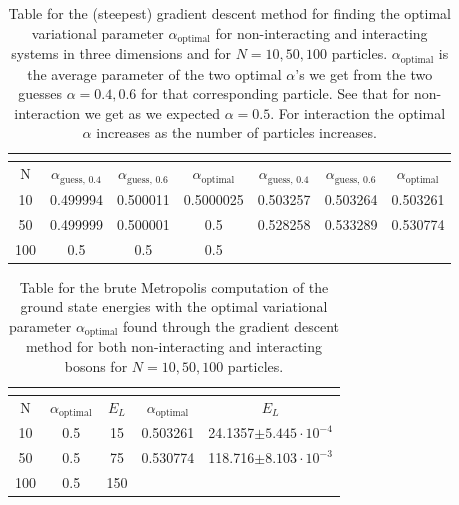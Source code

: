 \documentclass[12pt,a4paper,english]{article}
\begin{document}
\begin{table}[htbp!]
	\centering
	\begin{tabular}{ |c|c|c|c|c|c|c| }
		\hline \rule{0pt}{13pt}
		\text{System} & \multicolumn{3}{c|}{\text{Non-interacting}}  & \multicolumn{3}{c|}{\text{Interacting}}\\
		\hline \rule{0pt}{13pt}
		N & $\alpha_{\text{guess, 0.4}}$ & $\alpha_{\text{guess, 0.6}}$ & $\alpha_{\text{optimal}}$ & $\alpha_{\text{guess, 0.4}}$ & $\alpha_{\text{guess, 0.6}}$ & $\alpha_{\text{optimal}}$  \\
		\hline \rule{0pt}{13pt}
		10 & 0.499994 & 0.500011 & 0.5000025 & 0.503257 & 0.503264 & 0.503261 \\
		\hline \rule{0pt}{13pt}
		50 & 0.499999 & 0.500001 & 0.5 & 0.528258 & 0.533289 & 0.530774 \\
		\hline \rule{0pt}{13pt}
		100 & 0.5 & 0.5 & 0.5 &  &  &  \\
		\hline
	\end{tabular}	
	\caption{Table for the (steepest) gradient descent method for finding the optimal variational parameter $\alpha_{\text{optimal}}$ for non-interacting and interacting systems in three dimensions and for $N=10,50,100$ particles. $\alpha_{\text{optimal}}$ is the average parameter of the two optimal $\alpha$'s we get from the two guesses $\alpha=0.4,0.6$ for that corresponding particle. See that for non-interaction we get as we expected $\alpha=0.5$. For interaction the optimal $\alpha$ increases as the number of particles increases. \label{tab:gradient}}
\end{table}

\begin{table}[htbp!]
	\centering
	\begin{tabular}{ |c|c|c|c|c| }
		\hline \rule{0pt}{13pt}
		\text{System} & \multicolumn{2}{c|}{\text{Non-interacting}}  & \multicolumn{2}{c|}{\text{Interacting}} \\
		\hline \rule{0pt}{13pt}
		N &  $\alpha_{\text{optimal}}$ & $E_L$ & $\alpha_{\text{optimal}}$ & $E_L$ \\
		\hline \rule{0pt}{13pt}
		10 & 0.5 & 15 & 0.503261 & 24.1357$\pm5.445\cdot10^{-4}$ \\
		\hline \rule{0pt}{13pt}
		50 & 0.5 & 75 & 0.530774 & 118.716$\pm8.103\cdot10^{-3}$ \\
		\hline \rule{0pt}{13pt}
		100 & 0.5 & 150 &  &  \\
		\hline
	\end{tabular}	
	\caption{Table for the brute Metropolis computation of the ground state energies with the optimal variational parameter $\alpha_{\text{optimal}}$ found through the gradient descent method for both non-interacting and interacting bosons for $N=10,50,100$ particles. \label{tab:optimal_alpha_grad}}
\end{table}
\end{document}
